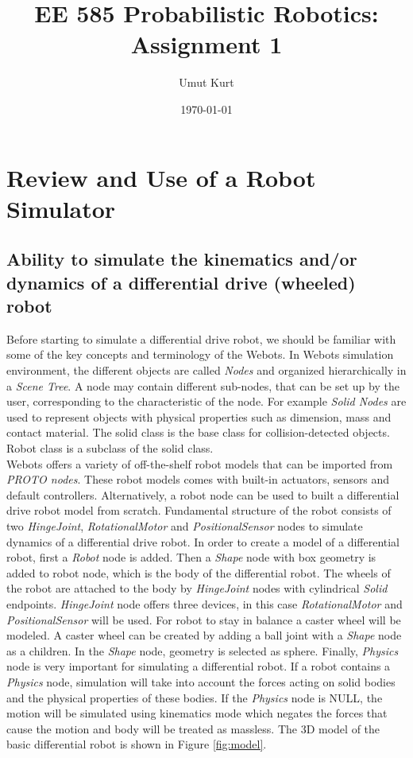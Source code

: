 \documentclass[11pt]{article}
\title{EE 585 Probabilistic Robotics: Assignment 1}
\author{Umut Kurt}
\date{\today}
\begin{document}
\maketitle
\section{Review and Use of a Robot Simulator}
\subsection{Ability to simulate the kinematics and/or dynamics of a differential drive (wheeled) robot}
    Before starting to simulate a differential drive robot, we should be familiar with some of the key concepts and terminology of the Webots. In Webots simulation environment, the different objects are called \textit{Nodes} and organized hierarchically in a \textit{Scene Tree}. A node may contain different sub-nodes, that can be set up by the user, corresponding to the characteristic of the node. For example \textit{Solid Nodes} are used to represent objects with physical properties such as dimension, mass and contact material. The solid class is the base class for collision-detected objects. Robot class is a subclass of the solid class.
    \\[\baselineskip]
    Webots offers a variety of off-the-shelf robot models that can be imported from \textit{PROTO nodes}. These robot models comes with built-in actuators, sensors and default controllers. Alternatively, a robot node can be used to built a differential drive robot model from scratch. Fundamental structure of the robot consists of two \emph{HingeJoint}, \emph{RotationalMotor} and \emph{PositionalSensor} nodes to simulate dynamics of a differential drive robot. In order to create a model of a differential robot, first a \emph{Robot} node is added. Then a \emph{Shape} node with box geometry is added to robot node, which is the body of the differential robot. The wheels of the robot are attached to the body by \emph{HingeJoint} nodes with cylindrical \emph{Solid} endpoints. \emph{HingeJoint} node offers three devices, in this case \emph{RotationalMotor} and \emph{PositionalSensor} will be used. For robot to stay in balance a caster wheel will be modeled. A caster wheel can be created by adding a ball joint with a \emph{Shape} node as a children. In the \emph{Shape} node, geometry is selected as sphere. Finally, \emph{Physics} node is very important for simulating a differential robot. If a robot contains a \emph{Physics} node, simulation will take into account the forces acting on solid bodies and the physical properties of these bodies. If the \emph{Physics} node is NULL, the motion will be simulated using kinematics mode which negates the forces that cause the motion and body will be treated as massless. The 3D model of the basic differential robot is shown in Figure \ref{fig:model}.
    
\end{document}
